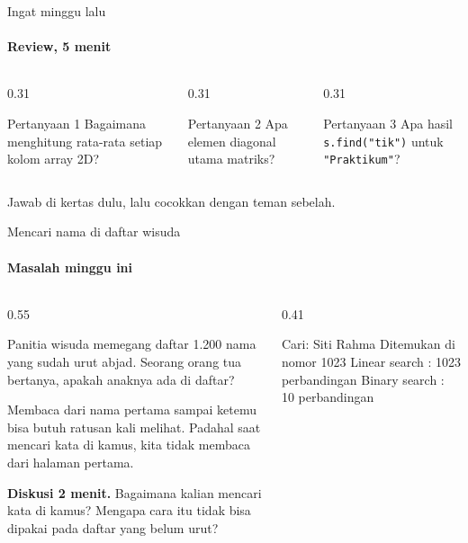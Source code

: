 \documentclass[t]{beamer}
\begin{document}
\begin{frame}{Ingat minggu lalu}
\framesubtitle{Review, 5 menit}
\begin{columns}[T]
\begin{column}{0.31\textwidth}
\begin{BlokGelap}{Pertanyaan 1}
Bagaimana menghitung rata-rata setiap kolom array 2D?
\end{BlokGelap}
\end{column}
\begin{column}{0.31\textwidth}
\begin{BlokGelap}{Pertanyaan 2}
Apa elemen diagonal utama matriks?
\end{BlokGelap}
\end{column}
\begin{column}{0.31\textwidth}
\begin{BlokGelap}{Pertanyaan 3}
Apa hasil \texttt{s.find("tik")} untuk \texttt{"Praktikum"}?
\end{BlokGelap}
\end{column}
\end{columns}
\vspace{8pt}
Jawab di kertas dulu, lalu cocokkan dengan teman sebelah.
\end{frame}


\begin{frame}[fragile]{Mencari nama di daftar wisuda}
\framesubtitle{Masalah minggu ini}
\begin{columns}[T]
\begin{column}{0.55\textwidth}
{Panitia wisuda memegang daftar 1.200 nama yang sudah urut abjad. Seorang orang tua bertanya, apakah anaknya ada di daftar?

\vspace{6pt}
Membaca dari nama pertama sampai ketemu bisa butuh ratusan kali melihat. Padahal saat mencari kata di kamus, kita tidak membaca dari halaman pertama.\par}
\vspace{6pt}
\begin{Catatan}
\textbf{Diskusi 2 menit.} Bagaimana kalian mencari kata di kamus? Mengapa cara itu tidak bisa dipakai pada daftar yang belum urut?
\end{Catatan}
\end{column}
\begin{column}{0.41\textwidth}
\begin{Keluaran}[]
Cari: Siti Rahma
Ditemukan di nomor 1023
Linear search : 1023 perbandingan
Binary search : 10 perbandingan
\end{Keluaran}
\end{column}
\end{columns}
\end{frame}
\end{document}
